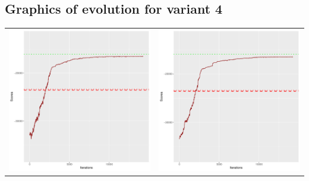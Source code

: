 \documentclass[]{scrartcl}
\begin{document}
\clearpage

\subsection{Graphics of evolution for variant 4}

\begin{table}[h!]
\begin{tabular}{cc}
\includegraphics[scale = 0.4]{./figs/win95pts/v4/25/boundsEvolution-14252.pdf} & 
\includegraphics[scale = 0.4]{./figs/win95pts/v4/50/boundsEvolution-14252.pdf} \\

\end{tabular}
\end{table}
\end{document}
